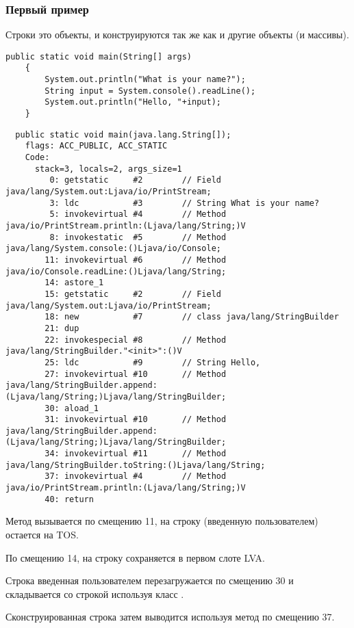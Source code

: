 \subsubsection{Первый пример}


Строки это объекты, и конструируются так же как и другие объекты (и массивы).

\begin{lstlisting}[style=customjava]
	public static void main(String[] args)
	{
		System.out.println("What is your name?");
		String input = System.console().readLine();
		System.out.println("Hello, "+input);
	}
\end{lstlisting}

\begin{lstlisting}
  public static void main(java.lang.String[]);
    flags: ACC_PUBLIC, ACC_STATIC
    Code:
      stack=3, locals=2, args_size=1
         0: getstatic     #2        // Field java/lang/System.out:Ljava/io/PrintStream;
         3: ldc           #3        // String What is your name?
         5: invokevirtual #4        // Method java/io/PrintStream.println:(Ljava/lang/String;)V
         8: invokestatic  #5        // Method java/lang/System.console:()Ljava/io/Console;
        11: invokevirtual #6        // Method java/io/Console.readLine:()Ljava/lang/String;
        14: astore_1      
        15: getstatic     #2        // Field java/lang/System.out:Ljava/io/PrintStream;
        18: new           #7        // class java/lang/StringBuilder
        21: dup           
        22: invokespecial #8        // Method java/lang/StringBuilder."<init>":()V
        25: ldc           #9        // String Hello, 
        27: invokevirtual #10       // Method java/lang/StringBuilder.append:(Ljava/lang/String;)Ljava/lang/StringBuilder;
        30: aload_1       
        31: invokevirtual #10       // Method java/lang/StringBuilder.append:(Ljava/lang/String;)Ljava/lang/StringBuilder;
        34: invokevirtual #11       // Method java/lang/StringBuilder.toString:()Ljava/lang/String;
        37: invokevirtual #4        // Method java/io/PrintStream.println:(Ljava/lang/String;)V
        40: return        
\end{lstlisting}


Метод  вызывается по смещению 11,  на строку (введенную пользователем) 
остается на \ac{TOS}.

По смещению 14,  на строку сохраняется в первом слоте \ac{LVA}.

Строка введенная пользователем перезагружается по смещению 30 и складывается со строкой 
используя класс .

Сконструированная строка затем выводится используя метод  по смещению 37.
